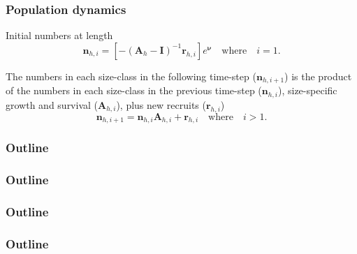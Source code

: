 \documentclass{beamer}
\begin{document}

\begin{frame}
\frametitle{Population dynamics}

Initial numbers at length
\begin{equation*}
  \boldsymbol{n}_{h,i} = \left[-\left( \boldsymbol{A}_{h} - \boldsymbol{I}
    \right)^{-1} \boldsymbol{r}_{h,i} \right] e^{\boldsymbol\nu} \quad
  \text{where} \quad i=1.
\end{equation*}

The numbers in each size-class in the following time-step
($\boldsymbol{n}_{h,i+1}$) is the product of the numbers in each size-class in
the previous time-step ($\boldsymbol{n}_{h,i}$), size-specific growth and
survival ($\boldsymbol{A}_{h,i}$), plus new recruits ($\boldsymbol{r}_{h,i}$)
\begin{equation*}
  \boldsymbol{n}_{h,i+1} = \boldsymbol{n}_{h,i} \boldsymbol{A}_{h,i} +
  \boldsymbol{r}_{h,i} \quad \text{where} \quad i > 1.
\end{equation*}



\end{frame}


\begin{frame}
\frametitle{Outline}
\tableofcontents
\end{frame}


\begin{frame}
\frametitle{Outline}
\tableofcontents
\end{frame}


\begin{frame}
\frametitle{Outline}
\tableofcontents
\end{frame}


\begin{frame}
\frametitle{Outline}
\tableofcontents
\end{frame}

\end{document}
